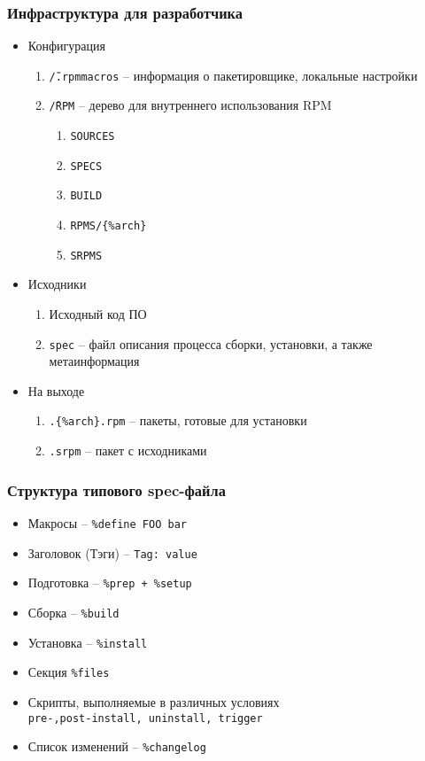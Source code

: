 \begin{frame}
	\frametitle{Инфраструктура для разработчика}
	
	\begin{itemize}
		\item Конфигурация
			\begin{enumerate}
				\item {\tt \~/.rpmmacros} -- информация о пакетировщике, локальные настройки
				\item {\tt \~/RPM} -- дерево для внутреннего использования RPM
					\begin{enumerate}
						\item {\tt SOURCES}
						\item {\tt SPECS}
						\item {\tt BUILD}
						\item {\tt RPMS/\{\%arch\}}
						\item {\tt SRPMS}
					\end{enumerate}
			\end{enumerate}
		\item Исходники
			\begin{enumerate}
				\item Исходный код ПО 
				\item {\tt spec} -- файл описания процесса сборки, установки, а также метаинформация
			\end{enumerate}

		\item На выходе
			\begin{enumerate}
				\item {\tt *.\{\%arch\}.rpm} -- пакеты, готовые для установки
				\item {\tt *.srpm} -- пакет с исходниками
			\end{enumerate}

	\end{itemize}
\end{frame}


\begin{frame}
	\frametitle{Структура типового spec-файла}

	\begin{itemize}
		\item Макросы -- {\tt \%define FOO bar}
		\item Заголовок (Тэги) -- {\tt Tag: value}
		\item Подготовка -- {\tt \%prep + \%setup}
		\item Сборка -- {\tt \%build}
		\item Установка -- {\tt \%install}
		\item Секция {\tt \%files}
		\item Скрипты, выполняемые в различных условиях\\
			{\tt pre-,post-install, uninstall, trigger}
		\item Список изменений -- {\tt \%changelog }
	\end{itemize}

\end{frame}

